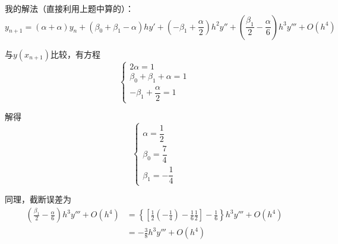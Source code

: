 \documentclass{article}
\begin{document}
\begin{CJK*}{UTF8}{gbsn}
我的解法（直接利用上题中算的）：
\[ y_{n + 1} = (\alpha + \alpha)y_n + (\beta_0 + \beta_1 - \alpha)hy' + \left(-\beta_1 + \frac{\alpha}{2}\right)h^2y'' + \left(\frac{\beta_1}{2} - \frac{\alpha}{6}\right)h^3y''' + O(h^4) \]

与$y(x_{n + 1})$比较，有方程
\[
\begin{cases}
2\alpha = 1 \\
\beta_0 + \beta_1 + \alpha = 1 \\
-\beta_1 + \dfrac{\alpha}{2} = 1
\end{cases}
\]

解得
\[
\begin{cases}
\alpha = \dfrac{1}{2} \\
\beta_0 = \dfrac{7}{4} \\
\beta_1 = -\dfrac{1}{4}
\end{cases}
\]

同理，截断误差为
\[
\begin{aligned}
\left( \frac{\beta_1}{2} - \frac{\alpha}{6} \right)h^3y''' + O(h^4) &= \left\{\left[ \frac{1}{2}\left( -\frac{1}{4} \right) - \frac{1}{6}\frac{1}{2} \right] - \frac{1}{6}\right\}h^3y''' + O(h^4) \\
&= -\frac{3}{8}h^3y''' + O(h^4)
\end{aligned}
\]

\end{CJK*}
\end{document}
